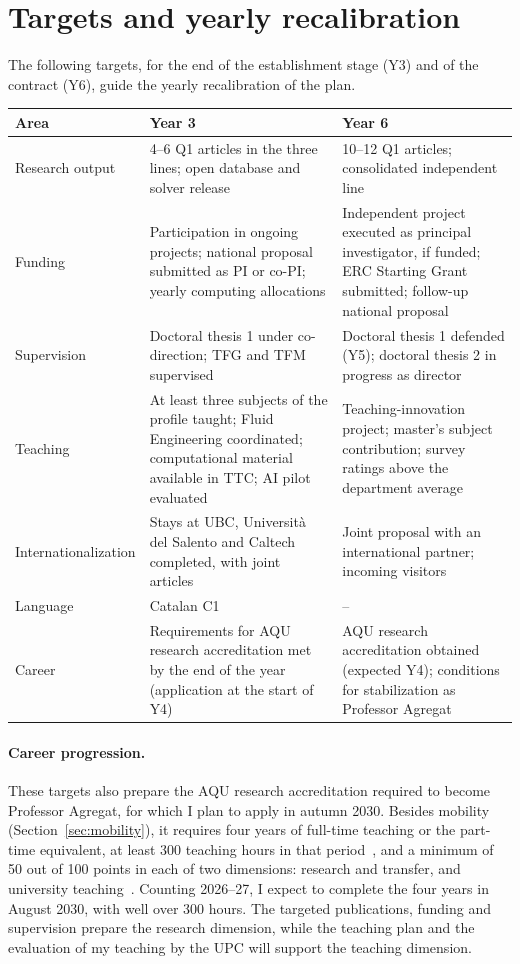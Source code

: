 \documentclass[11pt]{article}
\begin{document}
\section{Targets and yearly recalibration}\label{sec:targets}
The following targets, for the end of the establishment stage (Y3) and of the contract (Y6),
guide the yearly recalibration of the plan.
\begin{center}\small
\begin{tabularx}{\textwidth}{@{}p{3.0cm}XX@{}}
\toprule
\textbf{Area} & \textbf{Year 3} & \textbf{Year 6} \\
\midrule
Research output & 4--6 Q1 articles in the three lines; open database and solver release & 10--12 Q1 articles; consolidated independent line \\
Funding & Participation in ongoing projects; national proposal submitted as PI or co-PI; yearly computing allocations & Independent project executed as principal investigator, if funded; ERC Starting Grant submitted; follow-up national proposal \\
Supervision & Doctoral thesis 1 under co-direction; TFG and TFM supervised & Doctoral thesis 1 defended (Y5); doctoral thesis 2 in progress as director \\
Teaching & At least three subjects of the profile taught; Fluid Engineering coordinated; computational material available in TTC; AI pilot evaluated & Teaching-innovation project; master's subject contribution; survey ratings above the department average \\
Internationalization & Stays at UBC, Universit\`a del Salento and Caltech completed, with joint articles & Joint proposal with an international partner; incoming visitors \\
Language & Catalan C1 & -- \\
Career & Requirements for AQU research accreditation met by the end of the year (application at the start of Y4) & AQU research accreditation obtained (expected Y4); conditions for stabilization as Professor Agregat \\
\bottomrule
\end{tabularx}
\end{center}

\paragraph{Career progression.} These targets also prepare the AQU research accreditation required
to become Professor Agregat, for which I plan to apply in autumn 2030. Besides mobility
(Section~\ref{sec:mobility}), it requires four years of full-time teaching or the part-time
equivalent, at least 300 teaching hours in that period~\cite{AQUProc2025}, and a minimum of 50 out
of 100 points in each of two dimensions: research and transfer, and university
teaching~\cite{AQUCrit2025}. Counting 2026--27, I expect to complete the four years in August 2030,
with well over 300 hours. The targeted publications, funding and supervision prepare the research
dimension, while the teaching plan and the evaluation of my teaching by the UPC will support the
teaching dimension.
\end{document}
